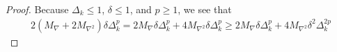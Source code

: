 \documentclass{article}
\newenvironment{comment}
  {\par\medskip
   \color{red}%
   \begin{framed}
   \textbf{Comment: }\ignorespaces}
 {\end{framed}
  \medskip}
\theoremstyle{case}
\numberwithin{theorem}{subsection}
\newcommand{\dk}{\Delta_k}
\newcommand{\maxgrad}{{M_{\nabla}}}
\newcommand{\maxhessian}{{M_{\nabla^2}}}
\begin{document}
\begin{proof}
% 
% 

Because $\dk \le 1$, $\delta \le 1$, and $p \ge 1$, we see that
\begin{align*}
2\left(\maxgrad + 2\maxhessian\right)\delta\dk^{p}
= 2\maxgrad \delta \dk^p + 4\maxhessian\delta\dk^{p}
\ge 2\maxgrad \delta \dk^p + 4\maxhessian\delta^2 \dk^{2p}
\end{align*}


\end{proof}
\end{document}
